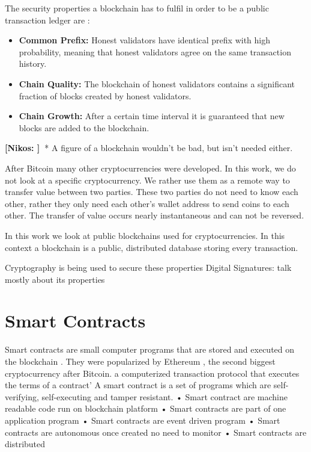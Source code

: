 \documentclass{cacthesis}
\newcommand{\authnote}[3]{{ \footnotesize \textbf{#1[#2: #3]~}}}
\newcommand{\niknote}[1]{\authnote{\color{red}}{Nikos}{#1}}
\begin{document}
The security properties a blockchain has to fulfil in order to be a public transaction ledger are \cite{bitcoin_backbone}:
\begin{itemize}
    \item \textbf{Common Prefix:} Honest validators have identical prefix with high probability, meaning that honest validators agree on the same transaction history.
    \item \textbf{Chain Quality:} The blockchain of honest validators contains a significant fraction of blocks created by honest validators.
    \item \textbf{Chain Growth:} After a certain time interval it is guaranteed that new blocks are added to the blockchain.
\end{itemize}

\niknote{}* A figure of a blockchain wouldn't be bad, but isn't needed either.  \newline

After Bitcoin many other cryptocurrencies were developed. In this work, we do not look at a specific cryptocurrency. We rather use them as a remote way to transfer value between two parties. These two parties do not need to know each other, rather they only need each other's wallet address to send coins to each other. The transfer of value occurs nearly instantaneous and can not be reversed.


In this work we look at public blockchains used for cryptocurrencies. In this context a blockchain is a public, distributed database storing every transaction. 

Cryptography is being used to secure these properties
Digital Signatures:\cite{Katz2020-aj} 
talk mostly about its properties
\section{Smart Contracts}
Smart contracts are small computer programs that are stored and executed on the blockchain \cite{chrisistidis}. They were popularized by Ethereum \cite{buterin_ethereum_nodate}, the second biggest cryptocurrency after Bitcoin. 
a computerized transaction protocol that executes the terms of a contract’
A smart contract is a set of programs which are self-verifying, self-executing and tamper resistant. 
• Smart contract are machine readable code run on blockchain platform
• Smart contracts are part of one application program
• Smart contracts are event driven program
• Smart contracts are autonomous once created no need to
monitor
• Smart contracts are distributed\cite{sc18}
\end{document}
